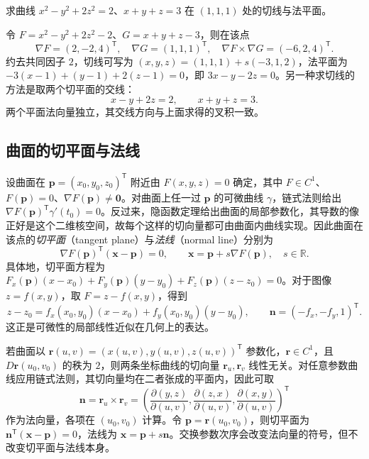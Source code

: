 \documentclass[UTF8,12pt,a4paper,fontset=fandol]{ctexbook}
\begin{document}
\begin{example}
\label{ex:implicit-space-curve-tangent-ch14}
求曲线 $x^2-y^2+2z^2=2$、$x+y+z=3$ 在 $(1,1,1)$ 处的切线与法平面。
\end{example}
\begin{solve}
令 $F=x^2-y^2+2z^2-2$、$G=x+y+z-3$，则在该点
\[
    \nabla F=(2,-2,4)^{\mathsf T},\quad
    \nabla G=(1,1,1)^{\mathsf T},\quad
    \nabla F\times\nabla G=(-6,2,4)^{\mathsf T}.
\]
约去共同因子 $2$，切线可写为 $(x,y,z)=(1,1,1)+s(-3,1,2)$，法平面为 $-3(x-1)+(y-1)+2(z-1)=0$，即 $3x-y-2z=0$。另一种求切线的方法是取两个切平面的交线：
\[
    x-y+2z=2,\qquad x+y+z=3.
\]
两个平面法向量独立，其交线方向与上面求得的叉积一致。
\end{solve}

\subsection{曲面的切平面与法线}
\label{subsec:tangent-planes-and-normal-lines-of-surfaces}

设曲面在 $\boldsymbol p=(x_0,y_0,z_0)^{\mathsf T}$ 附近由 $F(x,y,z)=0$ 确定，其中 $F\in C^1$、$F(\boldsymbol p)=0$、$\nabla F(\boldsymbol p)\ne\boldsymbol0$。对曲面上任一过 $\boldsymbol p$ 的可微曲线 $\gamma$，链式法则给出 $\nabla F(\boldsymbol p)^{\mathsf T}\gamma'(t_0)=0$。反过来，隐函数定理给出曲面的局部参数化，其导数的像正好是这个二维核空间，故每个这样的切向量都可由曲面内曲线实现。因此曲面在该点的\emph{切平面}（tangent plane）与\emph{法线}（normal line）分别为
\begin{equation}
\label{eq:implicit-surface-tangent-normal-ch14}
    \nabla F(\boldsymbol p)^{\mathsf T}(\boldsymbol x-\boldsymbol p)=0,
    \qquad \boldsymbol x=\boldsymbol p+s\nabla F(\boldsymbol p),\quad s\in\mathbb R.
\end{equation}
具体地，切平面方程为 $F_x(\boldsymbol p)(x-x_0)+F_y(\boldsymbol p)(y-y_0)+F_z(\boldsymbol p)(z-z_0)=0$。对于图像 $z=f(x,y)$，取 $F=z-f(x,y)$，得到
\[
    z-z_0=f_x(x_0,y_0)(x-x_0)+f_y(x_0,y_0)(y-y_0),\qquad
    \boldsymbol n=(-f_x,-f_y,1)^{\mathsf T}.
\]
这正是可微性的局部线性近似在几何上的表达。

若曲面以 $\boldsymbol r(u,v)=(x(u,v),y(u,v),z(u,v))^{\mathsf T}$ 参数化，$\boldsymbol r\in C^1$，且 $D\boldsymbol r(u_0,v_0)$ 的秩为 $2$，则两条坐标曲线的切向量 $\boldsymbol r_u,\boldsymbol r_v$ 线性无关。对任意参数曲线应用链式法则，其切向量均在二者张成的平面内，因此可取
\begin{equation}
\label{eq:parametric-surface-normal-ch14}
    \boldsymbol n=\boldsymbol r_u\times\boldsymbol r_v
       =\left(\frac{\partial(y,z)}{\partial(u,v)},
              \frac{\partial(z,x)}{\partial(u,v)},
              \frac{\partial(x,y)}{\partial(u,v)}\right)^{\mathsf T}
\end{equation}
作为法向量，各项在 $(u_0,v_0)$ 计算。令 $\boldsymbol p=\boldsymbol r(u_0,v_0)$，则切平面为 $\boldsymbol n^{\mathsf T}(\boldsymbol x-\boldsymbol p)=0$，法线为 $\boldsymbol x=\boldsymbol p+s\boldsymbol n$。交换参数次序会改变法向量的符号，但不改变切平面与法线本身。
\end{document}
